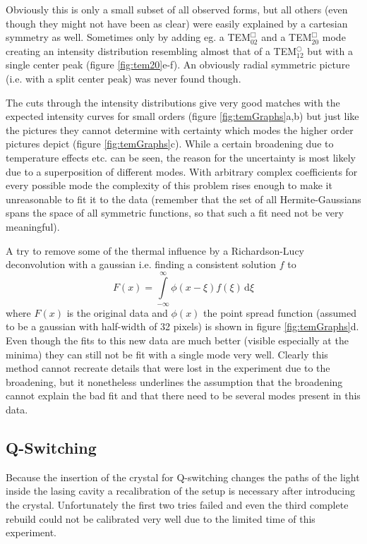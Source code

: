 \documentclass[a4paper]{scrartcl}
\numberwithin{equation}{section}
\numberwithin{figure}{section}
\numberwithin{table}{section}
\newcommand{\eq}[2]{\begin{equation}#1\label{#2}\end{equation}}
\begin{document}
Obviously this is only a small subset of all observed forms, but all others (even though they might not have been as clear) were easily explained by a cartesian symmetry as well. Sometimes only by adding eg. a TEM$^\Box_{02}$ and a TEM$^\Box_{20}$ mode creating an intensity distribution resembling almost that of a TEM$^\bigcirc_{12}$ but with a single center peak (figure \ref{fig:tem20}e-f). An obviously radial symmetric picture (i.e. with a split center peak) was never found though.




The cuts through the intensity distributions give very good matches with the expected intensity curves for small orders (figure \ref{fig:temGraphs}a,b) but just like the pictures they cannot determine with certainty which modes the higher order pictures depict (figure \ref{fig:temGraphs}c). While a certain broadening due to temperature effects etc. can be seen, the reason for the uncertainty is most likely due to a superposition of different modes. With arbitrary complex coefficients for every possible mode the complexity of this problem rises enough to make it unreasonable to fit it to the data (remember that the set of all Hermite-Gaussians spans the space of all symmetric functions, so that such a fit need not be very meaningful).

A try to remove some of the thermal influence by a Richardson-Lucy deconvolution with a gaussian i.e. finding a consistent solution $f$ to 
\eq{F(x)=\int\limits_{-\infty}^{\infty}\!\!\phi(x-\xi) f(\xi) \, \text{d}\xi}{}
where $F(x)$ is the original data and $\phi(x)$ the point spread function (assumed to be a gaussian with half-width of 32 pixels) is shown in figure \ref{fig:temGraphs}d. Even though the fits to this new data are much better (visible especially at the minima) they can still not be fit with a single mode very well. Clearly this method cannot recreate details that were lost in the experiment due to the broadening, but it nonetheless underlines the assumption that the broadening cannot explain the bad fit and that there need to be several modes present in this data.

\FloatBarrier


\subsection{Q-Switching}
Because the insertion of the crystal for Q-switching changes the paths of the light inside the lasing cavity a recalibration of the setup is necessary after introducing the crystal. Unfortunately the first two tries failed and even the third complete rebuild could not be calibrated very well due to the limited time of this experiment. 
\end{document}
